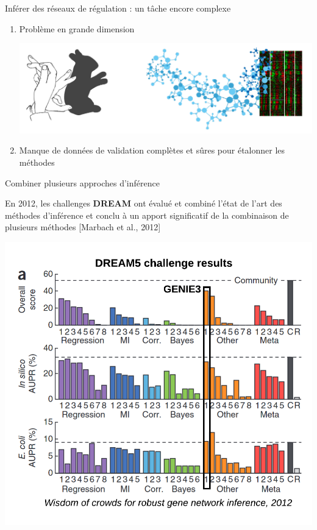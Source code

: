 

\begin{frame}{Inférer des réseaux de régulation : un tâche encore complexe}
	
	\begin{enumerate}
	    \item Problème en grande dimension
	    
	    \includegraphics[scale=0.2]{Figures/Intro/shadowplay.png}
	    
	    
	    \item Manque de données de validation complètes et sûres pour étalonner les méthodes
	\end{enumerate}

\end{frame}




\begin{frame}{Combiner plusieurs approches d'inférence}

\scriptsize En 2012, les challenges \textbf{DREAM} ont évalué et combiné l'état de l'art des méthodes d'inférence  et conclu à un apport significatif de la combinaison de plusieurs méthodes [Marbach et al., 2012]

\centering
\includegraphics[scale = 0.38]{Figures/Regression/dream5.png}
\end{frame}









